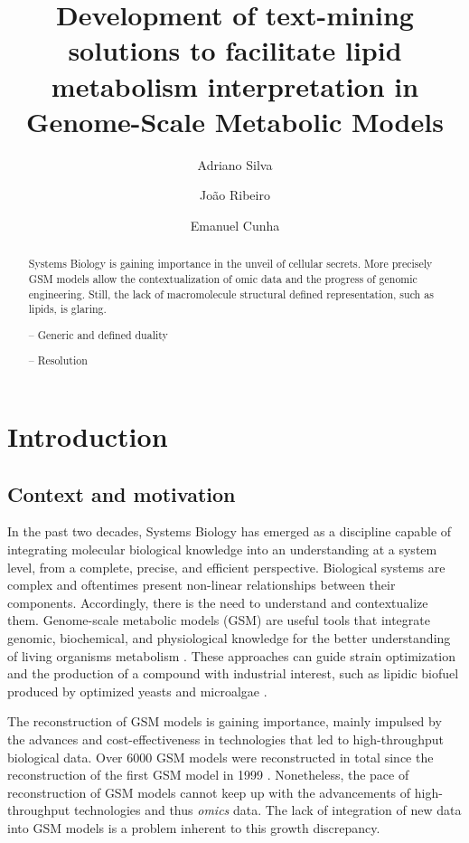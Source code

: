 \documentclass{llncs}
\begin{document}
\pagestyle{myheadings}
\title{Development of text-mining solutions to facilitate lipid metabolism interpretation in Genome-Scale Metabolic Models}

\author{Adriano Silva\and
João Ribeiro\and
Emanuel Cunha}

%
\maketitle              %
%
\begin{abstract}
Systems Biology is gaining importance in the unveil of cellular secrets. More precisely GSM models allow the contextualization of omic data and the progress of genomic engineering.
Still, the lack of macromolecule structural defined representation, such as lipids, is glaring.

-- Generic and defined duality

-- Resolution

\end{abstract}
%
%
%
\section{Introduction}
\subsection{Context and motivation}
In the past two decades, Systems Biology has emerged as a discipline capable of integrating molecular biological knowledge into an understanding at a system level, from a complete, precise, and efficient perspective.
Biological systems are complex and oftentimes present non-linear relationships between their components. Accordingly, there is the need to understand and contextualize them.
Genome-scale metabolic models (GSM) are useful tools that integrate genomic, biochemical, and physiological knowledge for the better understanding of living organisms metabolism \cite{Zou2018,Tavassoly2018}. 
These approaches can guide strain optimization and the production of a compound with industrial interest, such as lipidic biofuel produced by optimized yeasts and microalgae \cite{Sawangkeaw2013}.

The reconstruction of GSM models is gaining importance, mainly impulsed by the advances and cost-effectiveness in technologies that led to high-throughput biological data.
Over 6000 GSM models were reconstructed in total \cite{Gu2019} since the reconstruction of the first GSM model in 1999 \cite{Edwards1999}.
Nonetheless, the pace of reconstruction of GSM models cannot keep up with the advancements of high-throughput technologies and thus \textit{omics} data. The lack of integration of new data into GSM models is a problem inherent to this growth discrepancy.
\end{document}
